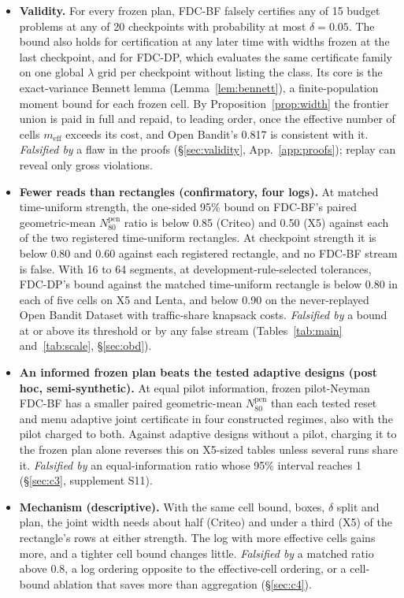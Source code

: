 \documentclass[sigconf,anonymous,review]{acmart}
\newcommand{\Npen}{N_{80}^{\text{pen}}}
\newcommand{\meff}{m_{\text{eff}}}
\begin{document}
\begin{itemize}
\item[\textbf{C1}] \textbf{Validity.} For every frozen plan, FDC-BF falsely certifies any of 15 budget problems at any of 20 checkpoints with probability at most $\delta = 0.05$. The bound also holds for certification at any later time with widths frozen at the last checkpoint, and for FDC-DP, which evaluates the same certificate family on one global $\lambda$ grid per checkpoint without listing the class. Its core is the exact-variance Bennett lemma (Lemma~\ref{lem:bennett}), a finite-population moment bound for each frozen cell. By Proposition~\ref{prop:width} the frontier union is paid in full and repaid, to leading order, once the effective number of cells $\meff$ exceeds its cost, and Open Bandit's 0.817 is consistent with it. \emph{Falsified by} a flaw in the proofs (\S\ref{sec:validity}, App.~\ref{app:proofs}); replay can reveal only gross violations.
\item[\textbf{C2}] \textbf{Fewer reads than rectangles (confirmatory, four logs).} At matched time-uniform strength, the one-sided 95\% bound on FDC-BF's paired geometric-mean $\Npen$ ratio is below 0.85 (Criteo) and 0.50 (X5) against each of the two registered time-uniform rectangles. At checkpoint strength it is below 0.80 and 0.60 against each registered rectangle, and no FDC-BF stream is false. With 16 to 64 segments, at development-rule-selected tolerances, FDC-DP's bound against the matched time-uniform rectangle is below 0.80 in each of five cells on X5 and Lenta, and below 0.90 on the never-replayed Open Bandit Dataset with traffic-share knapsack costs. \emph{Falsified by} a bound at or above its threshold or by any false stream (Tables~\ref{tab:main} and~\ref{tab:scale}, \S\ref{sec:obd}).
\item[\textbf{C3}] \textbf{An informed frozen plan beats the tested adaptive designs (post hoc, semi-synthetic).} At equal pilot information, frozen pilot-Neyman FDC-BF has a smaller paired geometric-mean $\Npen$ than each tested reset and menu adaptive joint certificate in four constructed regimes, also with the pilot charged to both. Against adaptive designs without a pilot, charging it to the frozen plan alone reverses this on X5-sized tables unless several runs share it. \emph{Falsified by} an equal-information ratio whose 95\% interval reaches 1 (\S\ref{sec:c3}, supplement S11).
\item[\textbf{C4}] \textbf{Mechanism (descriptive).} With the same cell bound, boxes, $\delta$ split and plan, the joint width needs about half (Criteo) and under a third (X5) of the rectangle's rows at either strength. The log with more effective cells gains more, and a tighter cell bound changes little. \emph{Falsified by} a matched ratio above 0.8, a log ordering opposite to the effective-cell ordering, or a cell-bound ablation that saves more than aggregation (\S\ref{sec:c4}).
\end{itemize}
\end{document}
